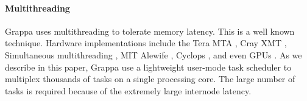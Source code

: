 \paragraph{Multithreading}
Grappa uses multithreading to tolerate memory latency. This is a well known
technique. Hardware implementations include the Tera MTA \cite{Tera}, Cray XMT
\cite{XMT}, Simultaneous multithreading \cite{SMT}, MIT Alewife
\cite{Alewife}, Cyclops \cite{Cyclops}, and even GPUs \cite{fatahalian}. As we
describe in this paper, Grappa use a lightweight user-mode task scheduler to
multiplex thousands of tasks on a single processing core. The large number of
tasks is required because of the extremely large internode latency.

